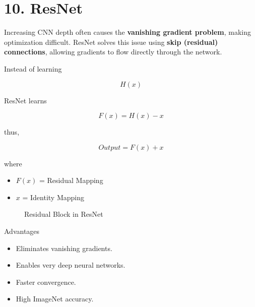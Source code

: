 \documentclass[11pt]{article}
\begin{document}

\section*{10. ResNet}

Increasing CNN depth often causes the \textbf{vanishing gradient problem},
making optimization difficult. ResNet solves this issue using
\textbf{skip (residual) connections}, allowing gradients to flow directly
through the network.

Instead of learning

\[
H(x)
\]

ResNet learns

\[
F(x)=H(x)-x
\]

thus,

\[
Output = F(x)+x
\]

where

\begin{itemize}
\item $F(x)$ = Residual Mapping
\item $x$ = Identity Mapping
\end{itemize}

\begin{figure}[H]
\centering


\caption{Residual Block in ResNet}
\end{figure}

Advantages

\begin{itemize}
\item Eliminates vanishing gradients.
\item Enables very deep neural networks.
\item Faster convergence.
\item High ImageNet accuracy.
\end{itemize}
\end{document}

